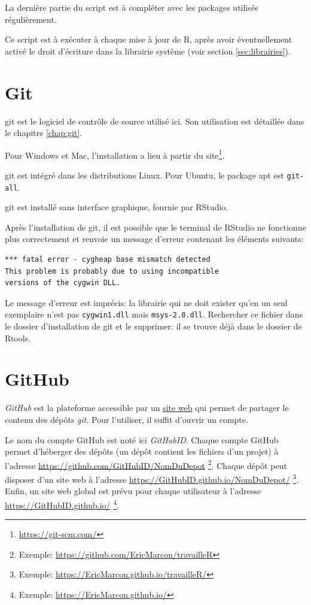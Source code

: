 \documentclass[
  11pt,
  french,
  a4paper,
  extrafontsizes,onecolumn,openright
  ]{memoir}
\begin{document}
\normalsize

La dernière partie du script est à compléter avec les packages utilisés régulièrement.

Ce script est à exécuter à chaque mise à jour de R, après avoir éventuellement activé le droit d'écriture dans la librairie système (voir section \ref{sec:librairies}).

\hypertarget{git}{%
\section{Git}\label{git}}

git est le logiciel de contrôle de source utilisé ici.
Son utilisation est détaillée dans le chapitre \ref{chap:git}.

Pour Windows et Mac, l'installation a lieu à partir du site\footnote{\url{https://git-scm.com/}}.

git est intégré dans les distributions Linux.
Pour Ubuntu, le package apt est \texttt{git-all}.

git est installé sans interface graphique, fournie par RStudio.

Après l'installation de git, il est possible que le terminal de RStudio ne fonctionne plus correctement et renvoie un message d'erreur contenant les éléments suivants:

\begin{verbatim}
*** fatal error - cygheap base mismatch detected
This problem is probably due to using incompatible 
versions of the cygwin DLL.
\end{verbatim}

Le message d'erreur est imprécis: la librairie qui ne doit exister qu'en un seul exemplaire n'est pas \texttt{cygwin1.dll} mais \texttt{msys-2.0.dll}.
Rechercher ce fichier dans le dossier d'installation de git et le supprimer: il se trouve déjà dans le dossier de Rtools.

\hypertarget{github}{%
\section{GitHub}\label{github}}

\emph{GitHub} est la plateforme accessible par un \href{https://github.com/}{site web} qui permet de partager le contenu des dépôts \emph{git}.
Pour l'utiliser, il suffit d'ouvrir un compte.

Le nom du compte GitHub est noté ici \emph{GitHubID}.
Chaque compte GitHub permet d'héberger des dépôts (un dépôt contient les fichiers d'un projet) à l'adresse \url{https://github.com/GitHubID/NomDuDepot} \footnote{Exemple: \url{https://github.com/EricMarcon/travailleR}}.
Chaque dépôt peut disposer d'un site web à l'adresse \url{https://GitHubID.github.io/NomDuDepot/} \footnote{Exemple: \url{https://EricMarcon.github.io/travailleR/}}.
Enfin, un site web global est prévu pour chaque utilisateur à l'adresse \url{https://GitHubID.github.io/} \footnote{Exemple: \url{https://EricMarcon.github.io/}}.
\end{document}
